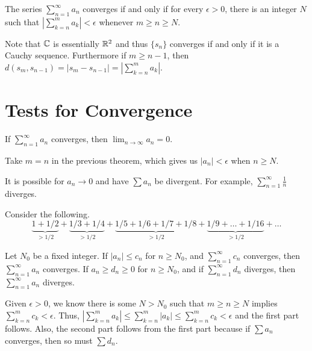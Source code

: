 \documentclass{mathnotes}
\begin{document}
\begin{prop}
  The series $\sum_{n=1}^\infty a_n$ converges if and only if for every
  $\epsilon>0$, there is an integer $N$ such that $|\sum_{k=n}^m a_k|<\epsilon$
  whenever $m\ge n\ge N$.
\end{prop}

\begin{pf}
  Note that $\mathbb{C}$ is essentially $\mathbb{R}^2$ and thus $\{s_n\}$ converges if and
  only if it is a Cauchy sequence. Furthermore if $m\ge n-1$, then
  $d(s_m,s_{n-1})=|s_m-s_{n-1}|=|\sum_{k=n}^m a_k|$.
\end{pf}

\section*{Tests for Convergence}

\begin{prop}
  If $\sum_{n=1}^\infty a_n$ converges, then $\lim_{n\to\infty}a_n=0$.
\end{prop}

\begin{pf}
  Take $m=n$ in the previous theorem, which gives us $|a_n|<\epsilon$ when
  $n\ge N$.
\end{pf}

\begin{note}
  It is possible for $a_n\to0$ and have $\sum a_n$ be divergent. For example,
  $\sum_{n=1}^\infty\frac{1}{n}$ diverges.
\end{note}

\begin{pfi}
  Consider the following.
  $$\underbrace{1+1/2}_{>1/2}+
  \underbrace{1/3+1/4}_{>1/2}+
  \underbrace{1/5+1/6+1/7+1/8}_{>1/2}+
  \underbrace{1/9+\ldots+1/16}_{>1/2}+\ldots$$
\end{pfi}

\begin{thm}
  Let $N_0$ be a fixed integer. If $|a_n|\le c_n$ for $n\ge N_0$, and
  $\sum_{n=1}^\infty c_n$ converges, then $\sum_{n=1}^\infty a_n$ converges. If
  $a_n\ge d_n\ge 0$ for $n\ge N_0$, and if $\sum_{n=1}^\infty d_n$ diverges,
  then $\sum_{n=1}^\infty a_n$ diverges.
\end{thm}

\begin{pf}
  Given $\epsilon>0$, we know there is some $N>N_0$ such that $m\ge n\ge N$
  implies $\sum_{k=n}^mc_k<\epsilon$. Thus,
  $|\sum_{k=n}^ma_k|\le\sum_{k=n}^m|a_k|\le\sum_{k=n}^mc_k<\epsilon$ and the
  first part follows. Also, the second part follows from the first part because
  if $\sum a_n$ converges, then so must $\sum d_n$.
\end{pf}
\end{document}
